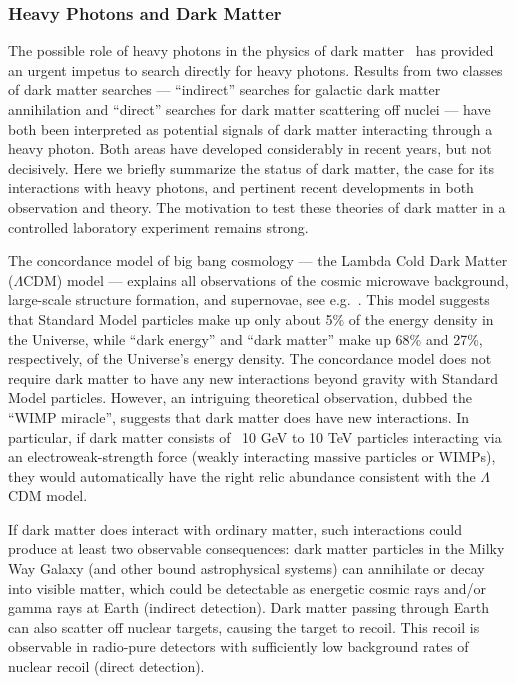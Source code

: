 \subsubsection{Heavy Photons and Dark Matter}
The possible role of heavy photons in the physics of dark matter~\cite{ArkaniHamed:2008qn,Pospelov:2008jd} has provided an urgent impetus to search directly for heavy photons.  Results from two classes of dark matter searches --- ``indirect'' searches for galactic dark matter annihilation and ``direct'' searches for dark matter scattering off nuclei --- have both been interpreted as potential signals of dark matter interacting through a heavy photon.  Both areas have developed considerably in recent years, but not decisively.  Here we briefly summarize the status of dark matter, the case for its interactions with heavy photons,  and pertinent recent developments in both observation and theory.  The motivation to test these theories of dark matter in a controlled laboratory experiment remains strong.    

The concordance model of big bang cosmology --- the Lambda Cold Dark Matter ($\Lambda$CDM) model --- explains all observations of the cosmic microwave background, large-scale structure formation, and supernovae, see 
e.g.~\cite{LambdaCDMData}. This model suggests that Standard Model particles make up only about 5\% of the energy density in the Universe, while ``dark energy'' and ``dark matter'' make up 68\% and 27\%, respectively, of the Universe's energy density. The concordance model does not require dark matter to have any new interactions beyond gravity with Standard Model particles. However, an intriguing theoretical observation, dubbed the ``WIMP miracle'', suggests that dark matter does have new interactions. In particular, if dark matter consists of ~10 GeV to 10 TeV particles interacting via an electroweak-strength force (weakly interacting massive particles or WIMPs), they would automatically have the right relic abundance consistent with the $\Lambda$CDM model.

If dark matter does interact with ordinary matter, such interactions could produce at least two observable consequences: dark matter particles in the Milky Way Galaxy (and other bound astrophysical systems) can annihilate or decay into visible matter, which could be detectable as energetic cosmic rays and/or gamma rays at Earth (indirect detection).  Dark matter passing through Earth can also scatter off nuclear targets, causing the target to recoil.  This recoil is observable in radio-pure detectors with sufficiently low background rates of nuclear recoil (direct detection).  

